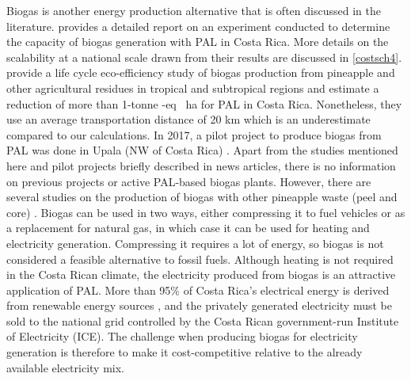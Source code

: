 Biogas is another energy production alternative that is often discussed in the literature. \cite{arce2014determinacion} provides a detailed report on an experiment conducted to determine the capacity of biogas generation with PAL in Costa Rica. More details on the scalability at a national scale drawn from their results are discussed in \cref{costsch4}. \cite{kohlmann2015, barz2019agricultural} provide a life cycle eco-efficiency study of biogas production from pineapple and other agricultural residues in tropical and subtropical regions and estimate a reduction of more than 1-tonne -eq \si{\per\hectare} for PAL in Costa Rica. Nonetheless, they use an average transportation distance of 20 km which is an underestimate compared to our calculations. In 2017, a pilot project to produce biogas from PAL was done in Upala (NW of Costa Rica) \citep{iceValle}. Apart from the studies mentioned here and pilot projects briefly described in news articles, there is no information on previous projects or active PAL-based biogas plants. However, there are several studies on the production of biogas with other pineapple waste (peel and core) \cite{aili2021recent}. Biogas can be used in two ways, either compressing it to fuel vehicles or as a replacement for natural gas, in which case it can be used for heating and electricity generation. Compressing it requires a lot of energy, so biogas is not considered a feasible alternative to fossil fuels. Although heating is not required in the Costa Rican climate, the electricity produced from biogas is an attractive application of PAL. More than 95\% of Costa Rica's electrical energy is derived from renewable energy sources \cite{iceEnergia}, and the privately generated electricity must be sold to the national grid controlled by the Costa Rican government-run Institute of Electricity (ICE). The challenge when producing biogas for electricity generation is therefore to make it cost-competitive relative to the already available electricity mix.
 
